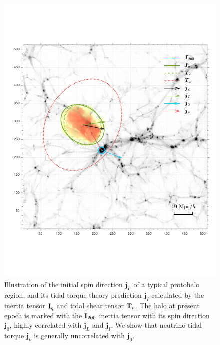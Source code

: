\documentclass[aps,prd,twocolumn,amsmath,amssymb,amsfont,superscriptaddress]{revtex4-1}
\newcommand{\bs}{\boldsymbol}
\begin{document}
\begin{figure}
\centering
  \includegraphics[width=1\linewidth]{f1}
 \caption{Illustration of the initial spin direction $\bs{j}_L$ of a typical protohalo region, and its tidal torque theory prediction $\bs{j}_I$ calculated by the inertia tensor $\bold{I}_q$ and tidal shear tensor $\bold{T}_c$. The halo at present epoch is marked with the $\bold{I}_{200}$ inertia tensor with its spin direction $\bs{j}_0$, highly correlated with $\bs{j}_L$ and $\bs{j}_I$. We show that neutrino tidal torque $\bs{j}_\nu$ is generally uncorrelated with $\bs{j}_0$.}\label{fig.1}
\end{figure}
\end{document}
